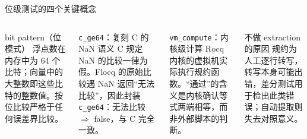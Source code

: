\documentclass[UTF8,aspectratio=169]{ctexbeamer}
\begin{document}
\begin{frame}{位级测试的四个关键概念}
  \begin{columns}[T]
    \begin{block}{bit pattern（位模式）}
      \small 浮点数在内存中为 64 个比特；向量中的大整数即这些比特的整数值。按位比较严格于任何误差界比较。
    \end{block}
    \begin{block}{\texttt{c\_ge64}：复刻 C 的 NaN 语义}
      \small C 规定 NaN 的比较一律为假。Flocq 的原始比较遇 NaN 返回``无法比较''，因此封装 \texttt{c\_ge64}：无法比较 $\Rightarrow$ false，与 C 完全一致。
    \end{block}
    \begin{block}{\texttt{vm\_compute}：内核级计算}
      \small Rocq 内核的虚拟机实际执行规约函数。``通过''的含义是内核确认等式两端相等，而非外部脚本的判断。
    \end{block}
    \begin{block}{不做 extraction 的原因}
      \small 规约为人工逐行转写，转写本身可能出错，差分测试用于检出此类错误；自动提取则失去对照意义。
    \end{block}
  \end{columns}
\end{frame}
\end{document}
